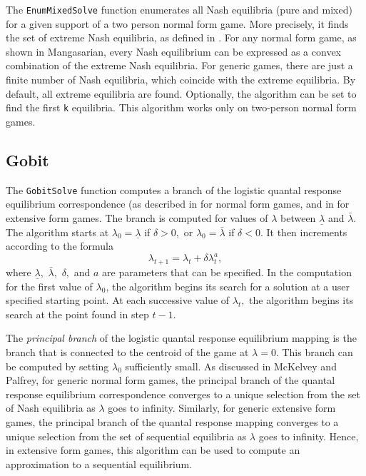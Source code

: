 The {\tt EnumMixedSolve} function enumerates all Nash equilibria (pure
and mixed) for a given support of a two person normal form game.  More
precisely, it finds the set of extreme Nash equilibria, as defined in
\cite[1964]{Man:64}.  For any normal form game, as shown in
Mangasarian, every Nash equilibrium can be expressed as a convex
combination of the extreme Nash equilibria.  For generic games, there
are just a finite number of Nash equilibria, which coincide with the
extreme equilibria.  By default, all extreme equilibria are found.
Optionally, the algorithm can be set to find the first \verb+k+
equilibria.  This algorithm works only on two-person normal form
games.

\subsection{Gobit}

The {\tt GobitSolve} function computes a branch of the logistic
quantal response equilibrium correspondence (as described in
\cite{McKPal:95a} for normal form games, and in
\cite{McKPal:95b} for extensive form games.  The branch is
computed for values of $\lambda$ between $\underline{\lambda}$ and
$\bar{\lambda}.$ The algorithm starts at $\lambda_0 =
\underline{\lambda}$ if $\delta>0,$ or $\lambda_0 = \bar{\lambda}$ if
$\delta<0$. It then increments according to the formula
$$
\lambda_{t+1} = \lambda_t +\delta \lambda_t^a,
$$ 
where $\underline\lambda,$ $\bar\lambda,$ $\delta,$ and $a$ are
parameters that can be specified.  In the computation for the first value of
$\lambda_0$, the algorithm begins its search for a solution at a user
specified starting point.  At each
successive value of $\lambda_t,$ the algorithm begins its search at
the point found in step $t - 1.$ 

The {\em principal branch} of the logistic quantal response
equilibrium mapping is the branch that is connected to the centroid of
the game at $\lambda = 0$.  This branch can be computed by setting
$\lambda_0$ sufficiently small.  As discussed in McKelvey and Palfrey,
for generic normal form games, the principal branch of the quantal
response equilibrium correspondence converges to a unique selection
from the set of Nash equilibria as $\lambda$ goes to infinity.
Similarly, for generic extensive form games, the principal branch of
the quantal response mapping converges to a unique selection from the
set of sequential equilibria as $\lambda$ goes to infinity.  Hence, in
extensive form games, this algorithm can be used to compute an
approximation to a sequential equilibrium.

